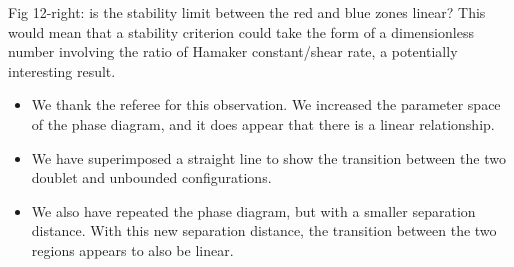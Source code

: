 \documentclass[11pt]{article}
\newcommand{\comment}[1]{{\color{blue} #1}}
\begin{document}
\noindent
\comment{Fig 12-right: is the stability limit between the red and blue
zones linear? This would mean that a stability criterion could take
the form of a dimensionless number involving the ratio of Hamaker
constant/shear rate, a potentially interesting result.}
\begin{itemize}
  \item We thank the referee for this observation.  We increased the
    parameter space of the phase diagram, and it does appear that there
    is a linear relationship.
  \item We have superimposed a straight line to show the transition
    between the two doublet and unbounded configurations.
  \item We also have repeated the phase diagram, but with a smaller
    separation distance.  With this new separation distance, the
    transition between the two regions appears to also be linear.
\end{itemize}
\end{document}
